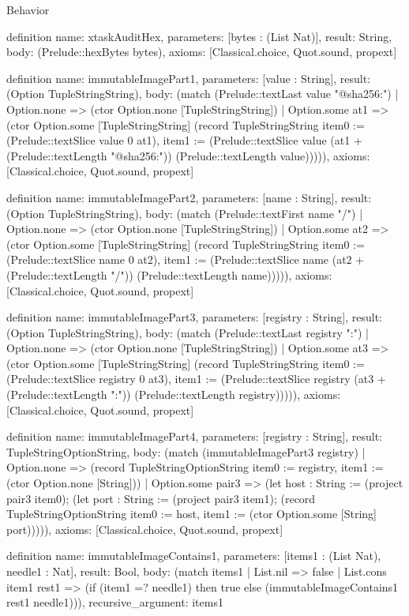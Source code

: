 \begin{lexlean}{Behavior}
\begin{semanticmodule}
definition{
  name: xtaskAuditHex,
  parameters: [bytes : (List Nat)],
  result: String,
  body: (Prelude::hexBytes bytes),
  axioms: [Classical.choice, Quot.sound, propext]
}

definition{
  name: immutableImagePart1,
  parameters: [value : String],
  result: (Option TupleStringString),
  body: (match (Prelude::textLast value "@sha256:")
    | Option.none => (ctor Option.none [TupleStringString])
    | Option.some at1 => (ctor Option.some [TupleStringString] (record TupleStringString {item0 := (Prelude::textSlice value 0 at1), item1 := (Prelude::textSlice value (at1 + (Prelude::textLength "@sha256:")) (Prelude::textLength value))}))),
  axioms: [Classical.choice, Quot.sound, propext]
}

definition{
  name: immutableImagePart2,
  parameters: [name : String],
  result: (Option TupleStringString),
  body: (match (Prelude::textFirst name "/")
    | Option.none => (ctor Option.none [TupleStringString])
    | Option.some at2 => (ctor Option.some [TupleStringString] (record TupleStringString {item0 := (Prelude::textSlice name 0 at2), item1 := (Prelude::textSlice name (at2 + (Prelude::textLength "/")) (Prelude::textLength name))}))),
  axioms: [Classical.choice, Quot.sound, propext]
}

definition{
  name: immutableImagePart3,
  parameters: [registry : String],
  result: (Option TupleStringString),
  body: (match (Prelude::textLast registry ":")
    | Option.none => (ctor Option.none [TupleStringString])
    | Option.some at3 => (ctor Option.some [TupleStringString] (record TupleStringString {item0 := (Prelude::textSlice registry 0 at3), item1 := (Prelude::textSlice registry (at3 + (Prelude::textLength ":")) (Prelude::textLength registry))}))),
  axioms: [Classical.choice, Quot.sound, propext]
}

definition{
  name: immutableImagePart4,
  parameters: [registry : String],
  result: TupleStringOptionString,
  body: (match (immutableImagePart3 registry)
    | Option.none => (record TupleStringOptionString {item0 := registry, item1 := (ctor Option.none [String])})
    | Option.some pair3 => (let host : String := (project pair3 item0); (let port : String := (project pair3 item1); (record TupleStringOptionString {item0 := host, item1 := (ctor Option.some [String] port)})))),
  axioms: [Classical.choice, Quot.sound, propext]
}

definition{
  name: immutableImageContains1,
  parameters: [items1 : (List Nat), needle1 : Nat],
  result: Bool,
  body: (match items1
    | List.nil => false
    | List.cons item1 rest1 => (if (item1 =? needle1) then true else (immutableImageContains1 rest1 needle1))),
  recursive_argument: items1
}


\end{semanticmodule}
\end{lexlean}
